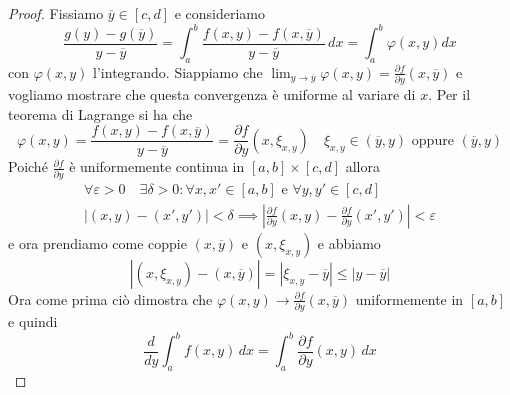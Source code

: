 \begin{proof}
    Fissiamo \(\overline{y} \in [c, d]\) e consideriamo 
    \[
        \frac{g(y) - g(\overline{y})}{y - \overline{y}} = \int_a^b
        \frac{f(x, y) - f(x, \overline{y})}{y - \overline{y}} \, dx = \int_a^b 
        \varphi(x, y) dx
    \]
    con \(\varphi(x, y)\) l'integrando.
    Siappiamo che \(\lim_{y \to \overline{y}} \varphi(x, y) = \frac{\partial
    f}{\partial y} (x, \overline{y})\) e vogliamo mostrare che questa
    convergenza è uniforme al variare di \(x\). Per il teorema di Lagrange si ha
    che 
    \[
        \varphi(x, y) = \frac{f(x, y) - f(x, \overline{y})}{y - \overline{y}} =
        \frac{\partial f}{\partial y} (x, \xi_{x, y}) \quad \xi_{x, y} \in
        (\overline{y}, y) \text{ oppure } (\overline{y}, y)
    \]
    Poiché \(\frac{\partial f}{\partial y}\) è uniformemente continua in \([a,
    b] \times [c, d]\) allora
    \begin{align*}
        \forall \varepsilon > 0 \quad \exists \delta > 0 : \forall x, x' \in [a,
        b] \text{ e } \forall y, y' \in [c, d]\\
        |(x, y) - (x', y')| < \delta \implies \left| \frac{\partial f}{\partial y}(x,
        y) - \frac{\partial f}{\partial y}(x', y') \right| < \varepsilon
    \end{align*}
    e ora prendiamo come coppie \((x, \overline{y})\) e \((x, \xi_{x, y})\) e
    abbiamo
    \[
        |(x, \xi_{x, y}) - (x, \overline{y})| = |\xi_{x, y} - \overline{y}| \le
        |y - \overline{y}|
    \]
    Ora come prima ciò dimostra che \(\varphi(x, y) \to \frac{\partial
    f}{\partial y}(x, \overline{y})\) uniformemente in \([a, b]\) e quindi
    \[
        \frac{d}{dy} \int_a^b f(x, y) \, dx = \int_a^b \frac{\partial
        f}{\partial y}(x, y) \, dx
    \]
\end{proof}

